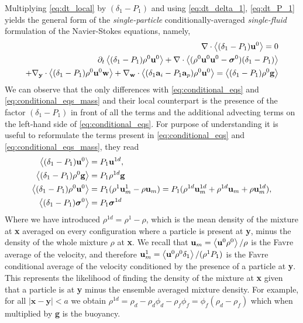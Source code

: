 Multiplying \ref{eq:dt_local} by $(\delta_1 - P_1)$ and using \ref{eq:dt_delta_1},  \ref{eq:dt_P_1} yields the general form of the \textit{single-particle} conditionally-averaged \textit{single-fluid} formulation of the Navier-Stokes equations, namely,  
\begin{align}
    \div \avg{(\delta_1 - P_1) \textbf{u}^0}
    = 0 
    \label{eq:conditional_eqs_mass}
    \\
    \pddt \avg{(\delta_1 - P_1)\rho^0 \textbf{u}^0}
    + \div \avg{(\rho^0 \textbf{u}^0 \textbf{u}^0 - \bm\sigma^0 )(\delta_1 - P_1)} \nonumber \\ 
    + \pddy\cdot \avg{(\delta_1 - P_1)\rho^0 \textbf{u}^0 \textbf{w}}
    + \pddw\cdot \avg{(\delta_1\textbf{a}_i - P_1\textbf{a}_p)\rho^0 \textbf{u}^0}
    = \avg{(\delta_1 - P_1 ) \rho^0 \textbf{g}}
    \label{eq:conditional_eqs}
\end{align}
We can observe that the only differences with \ref{eq:conditional_eqs} and \ref{eq:conditional_eqs_mass} and their local counterpart is the presence of the factor $(\delta_1 - P_1)$ in front of all the terms and the additional advecting terms on the left-hand side of \ref{eq:conditional_eqs}. 
For purpose of understanding it is useful to reformulate the terms present in \ref{eq:conditional_eqs} and \ref{eq:conditional_eqs_mass}, they read
\begin{align}
    \label{eq:examples1}
    \avg{(\delta_1 - P_1) \textbf{u}^0}
    &= P_1 \textbf{u}^{1d},\\ 
    \avg{(\delta_1 - P_1)\rho^0 \textbf{g}}
    &= P_1 \rho^{1d} \textbf{g}\\
    \avg{(\delta_1 - P_1)\rho^0 \textbf{u}^0}
    &= P_1 (\rho^1 \textbf{u}_m^1 -\rho \textbf{u}_m)
    = P_1 (\rho^{1d} \textbf{u}_m^{1d} +\rho^{1d} \textbf{u}_m+\rho \textbf{u}_m^{1d}),\\
    \avg{(\delta_1 - P_1) \bm\sigma^0} 
    &= 
    P_1 \bm\sigma^{1d} 
    \label{eq:examples}
\end{align}
Where we have introduced $\rho^{1d} = \rho^1 - \rho$, which is the mean density of the mixture at \textbf{x} averaged on every configuration where a particle is present at \textbf{y}, minus the density of the whole mixture $\rho$ at \textbf{x}.  
We recall that $\textbf{u}_m = \left<\textbf{u}^0\rho^0\right> / \rho$ is the Favre average of the velocity, and therefore $\textbf{u}^1_m = \left<\textbf{u}^0\rho^0\delta_1\right> / (\rho^1P_1)$ is the Favre conditional average of the velocity conditioned by the presence of a particle at \textbf{y}. 
This represents the likelihood of finding the density of the mixture at \textbf{x} given that  a particle is at \textbf{y} minus the ensemble averaged mixture density.
For example, for all $|\textbf{x}- \textbf{y}| <a$  we obtain $\rho^{1d} = \rho_d - \rho_d\phi_d - \rho_f \phi_f = \phi_f (\rho_d - \rho_f)$ which when multiplied by \textbf{g} is the buoyancy.  

